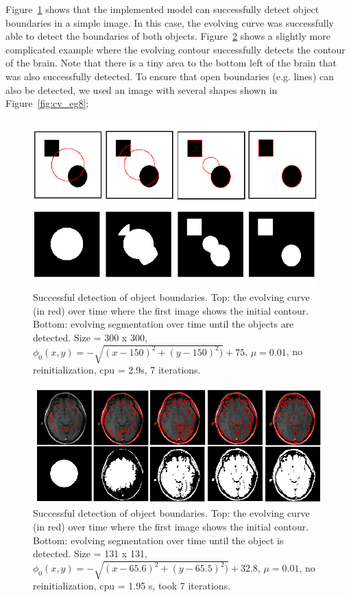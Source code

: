\documentclass[10pt,twocolumn,letterpaper]{article}
\begin{document}
Figure~\ref{fig:cv_eg1} shows that the implemented model can successfully detect object boundaries in a simple image. In this case, the evolving curve was
successfully able to detect the boundaries of both objects. Figure~\ref{fig:cv_eg2} shows a slightly more complicated example where the evolving contour
successfully detects the contour of the brain. Note that there is a tiny area to the bottom left of the brain that was also successfully detected. To ensure
that open boundaries (e.g. lines) can also be detected, we used an image with several shapes shown in Figure~\ref{fig:cv_eg8};


\begin{figure}[t]
\centering
\includegraphics[width=11cm]{cv_eg1.png}
\caption{Successful detection of object boundaries. Top: the evolving curve (in red) over time where the first image shows the initial contour.
Bottom: evolving segmentation over time until the objects are detected. Size = 300 x 300, $\phi_{0}(x,y) = - \sqrt{(x - 150)^2 + (y - 150)^2)} + 75$, $\mu =
0.01$, no reinitialization, cpu = 2.9s, 7 iterations.}
\label{fig:cv_eg1}
\end{figure}

\begin{figure}[t]
\centering
\includegraphics[width=12cm]{cv_eg2.png}
\caption{Successful detection of object boundaries. Top: the evolving curve (in red) over time where the first image shows the initial contour.
Bottom: evolving segmentation over time until the object is detected. Size = 131 x 131, $\phi_{0}(x,y) = - \sqrt{(x - 65.6)^2 + (y - 65.5)^2)} + 32.8$, $\mu =
0.01$, no reinitialization, cpu = 1.95 s, took 7 iterations.}
\label{fig:cv_eg2}
\end{figure}
\end{document}
